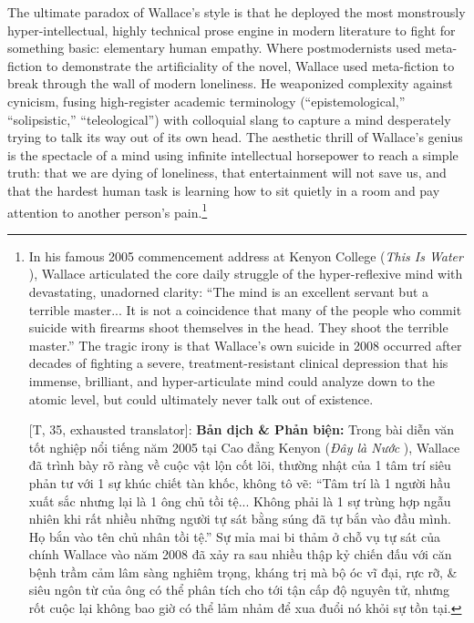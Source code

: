 \documentclass[11pt]{article}
\begin{document}
The ultimate paradox of Wallace's style is that he deployed the most monstrously hyper-intellectual, highly technical prose engine in modern literature to fight for something basic: elementary human empathy. Where postmodernists used meta-fiction to demonstrate the artificiality of the novel, Wallace used meta-fiction to break through the wall of modern loneliness. He weaponized complexity against cynicism, fusing high-register academic terminology (``epistemological,'' ``solipsistic,'' ``teleological'') with colloquial slang to capture a mind desperately trying to talk its way out of its own head. The aesthetic thrill of Wallace's genius is the spectacle of a mind using infinite intellectual horsepower to reach a simple truth: that we are dying of loneliness, that entertainment will not save us, and that the hardest human task is learning how to sit quietly in a room and pay attention to another person's pain.\footnote{In his famous 2005 commencement address at Kenyon College (\textit{This Is Water} \cite{Wallace_water}), Wallace articulated the core daily struggle of the hyper-reflexive mind with devastating, unadorned clarity: ``The mind is an excellent servant but a terrible master... It is not a coincidence that many of the people who commit suicide with firearms shoot themselves in the head. They shoot the terrible master.'' The tragic irony is that Wallace's own suicide in 2008 occurred after decades of fighting a severe, treatment-resistant clinical depression that his immense, brilliant, and hyper-articulate mind could analyze down to the atomic level, but could ultimately never talk out of existence.
	
	\textsf{[T, 35, exhausted translator]:} \textbf{Bản dịch \& Phản biện:} Trong bài diễn văn tốt nghiệp nổi tiếng năm 2005 tại Cao đẳng Kenyon (\textit{Đây là Nước} \cite{Wallace_water}), Wallace đã trình bày rõ ràng về cuộc vật lộn cốt lõi, thường nhật của 1 tâm trí siêu phản tư với 1 sự khúc chiết tàn khốc, không tô vẽ: ``Tâm trí là 1 người hầu xuất sắc nhưng lại là 1 ông chủ tồi tệ... Không phải là 1 sự trùng hợp ngẫu nhiên khi rất nhiều những người tự sát bằng súng đã tự bắn vào đầu mình. Họ bắn vào tên chủ nhân tồi tệ.'' Sự mỉa mai bi thảm ở chỗ vụ tự sát của chính Wallace vào năm 2008 đã xảy ra sau nhiều thập kỷ chiến đấu với căn bệnh trầm cảm lâm sàng nghiêm trọng, kháng trị mà bộ óc vĩ đại, rực rỡ, \& siêu ngôn từ của ông có thể phân tích cho tới tận cấp độ nguyên tử, nhưng rốt cuộc lại không bao giờ có thể lảm nhảm để xua đuổi nó khỏi sự tồn tại.}
\end{document}
